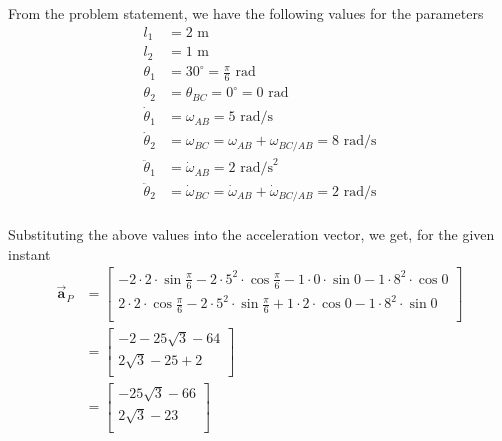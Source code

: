 From the problem statement, we have the following values for the parameters
\[
    \begin{aligned}
        l_1           & = 2\text{ m}                                                              \\
        l_2           & = 1\text{ m}                                                              \\
        \theta_1      & = 30^\circ = \frac{\pi}{6}\text{ rad}                                     \\
        \theta_2      & = \theta_{BC} = 0^\circ = 0\text{ rad}                                    \\
        \dot\theta_1  & = \omega_{AB} = 5\text{ rad/s}                                            \\
        \dot\theta_2  & = \omega_{BC} = \omega_{AB} + \omega_{BC/AB} = 8\text{ rad/s}             \\
        \ddot\theta_1 & = \dot\omega_{AB} = 2\text{ rad/s}^2                                      \\
        \ddot\theta_2 & = \dot\omega_{BC} = \dot\omega_{AB} + \dot\omega_{BC/AB} = 2\text{ rad/s} \\
    \end{aligned}
\]

Substituting the above values into the acceleration vector, we get, for the given instant
\begin{align*}
    \vec{\mathbf{a}}_P
     & =
    \begin{bmatrix}
        -2 \cdot 2 \cdot \sin\frac{\pi}{6} - 2 \cdot 5^2 \cdot \cos\frac{\pi}{6} - 1 \cdot 0 \cdot \sin 0 - 1 \cdot 8^2 \cdot \cos 0 \\
        2 \cdot 2 \cdot \cos\frac{\pi}{6} - 2 \cdot 5^2 \cdot \sin\frac{\pi}{6} + 1 \cdot 2 \cdot \cos 0 - 1 \cdot 8^2 \cdot \sin 0  \\
    \end{bmatrix} \\
     & =
    \begin{bmatrix}
        -2 - 25\sqrt{3} - 64 \\
        2\sqrt{3} - 25 + 2   \\
    \end{bmatrix}                                                                                                         \\
     & =
    \begin{bmatrix}
        - 25\sqrt{3} - 66 \\
        2\sqrt{3} - 23    \\
    \end{bmatrix}
    \tag{4.1}
\end{align*}

